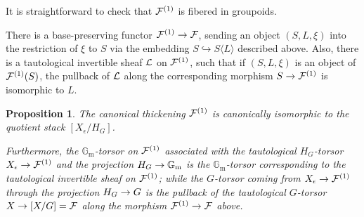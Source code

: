 \documentclass{amsart}
\numberwithin{equation}{section}
\numberwithin{subsection}{section}
\newtheorem{proposition}[theorem]{Proposition}
\theoremstyle{definition}
\theoremstyle{remark}
\newcommand\arr{\ifinner\to\else\longrightarrow\fi}
\newcommand\into{\hookrightarrow}
\newcommand\generate[1]{\langle #1 \rangle}
\newcommand{\gm}{\mathbb{G}_{\mathrm{m}}}
\begin{document}
It is straightforward to check that $\mathcal{F}^{(1)}$ is fibered in groupoids.

There is a base-preserving functor $\cF^{(1)} \arr \cF$, sending an object $(S, L, \xi)$ into the restriction of $\xi$ to $S$ via the embedding $S \into S\generate{L}$ described above. Also, there is a tautological invertible sheaf $\mathcal{L}$ on $\mathcal{F}^{(1)}$, such that if $(S, L, \xi)$ is an object of $\mathcal{F}^{(1)}(S)$, the pullback of $\mathcal{L}$ along the corresponding morphism $S \arr \cF^{(1)}$ is isomorphic to $L$.

\begin{proposition}\label{isoquot}
The canonical thickening $\mathcal{F}^{(1)}$ is canonically isomorphic to the quotient stack $[X_{\epsilon}/H_G]$.

Furthermore, the $\gm$-torsor on $\mathcal{F}^{(1)}$ associated with the tautological $H_{G}$-torsor $X_{\epsilon} \arr \cF^{(1)}$ and the projection $H_{G} \arr \gm$ is the $\gm$-torsor corresponding to the tautological invertible sheaf on $\mathcal{F}^{(1)}$; while the $G$-torsor coming from $X_{\epsilon} \arr \cF^{(1)}$ through the projection $H_{G} \arr G$ is the pullback of the tautological $G$-torsor $X \arr [X/G] = \cF$ along the morphism $\cF^{(1)} \arr \cF$ above.
\end{proposition}
\end{document}

